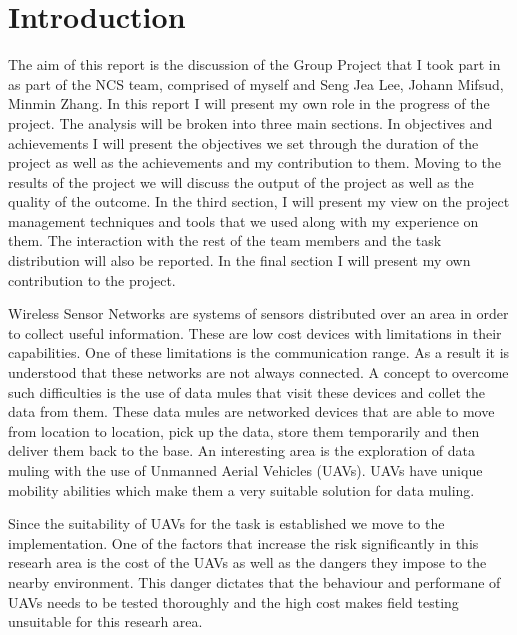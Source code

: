 





\tableofcontents{}

\pagebreak

\section{Introduction}
The aim of this report is the discussion of the Group Project that I took part
in as part of the NCS team, comprised of myself and Seng Jea Lee, Johann Mifsud,
Minmin Zhang. In this report I will present my own role in the progress of
the project. The analysis will be broken into three main sections. In objectives
and achievements I will present the objectives we set through the duration of
the project as well as the achievements and my contribution to them. Moving to
the results of the project we will discuss the output of the project as well as
the quality of the outcome. In the third section, I will present my view on the
project management techniques and tools that we used along with my experience on
them. The interaction with the rest of the team members and the task
distribution will also be reported. In the final section I will present my own
contribution to the project.

Wireless Sensor Networks are systems of sensors distributed over an area in
order to collect useful information. These are low cost devices with limitations
in their capabilities. One of these limitations is the communication range. As a
result it is understood that these networks are not always connected. A concept
to overcome such difficulties is the use of data mules that visit these devices
and collet the data from them. These data mules are networked devices that are
able to move from location to location, pick up the data, store them
temporarily and then deliver them back to the base. An interesting area is the
exploration of data muling with the use of Unmanned Aerial Vehicles (UAVs).
UAVs have unique mobility abilities which make them a very suitable solution
for data muling.

Since the suitability of UAVs for the task is established we move to the
implementation. One of the factors that increase the risk significantly in this
researh area is the cost of the UAVs as well as the dangers they impose to
the nearby environment. This danger dictates that the behaviour and performane of
UAVs needs to be tested thoroughly and the high cost makes field testing
unsuitable for this researh area.

